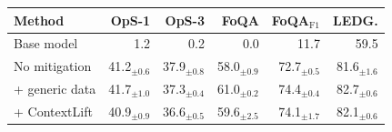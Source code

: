 \begin{tabular}{@{}l r r r r r@{}}
\toprule
\textbf{Method} & \textbf{OpS-1} & \textbf{OpS-3} & \textbf{FoQA} & \textbf{FoQA$_\text{F1}$} & \textbf{LEDG.} \\
\midrule
Base model & 1.2 & 0.2 & 0.0 & 11.7 & 59.5 \\
\midrule
No mitigation & 41.2$_{\pm0.6}$ & 37.9$_{\pm0.8}$ & 58.0$_{\pm0.9}$ & 72.7$_{\pm0.5}$ & 81.6$_{\pm1.6}$ \\
\quad + generic data & 41.7$_{\pm1.0}$ & 37.3$_{\pm0.4}$ & 61.0$_{\pm0.2}$ & 74.4$_{\pm0.4}$ & 82.7$_{\pm0.6}$ \\
\quad + ContextLift & 40.9$_{\pm0.9}$ & 36.6$_{\pm0.5}$ & 59.6$_{\pm2.5}$ & 74.1$_{\pm1.7}$ & 82.1$_{\pm0.6}$ \\
\bottomrule
\end{tabular}
